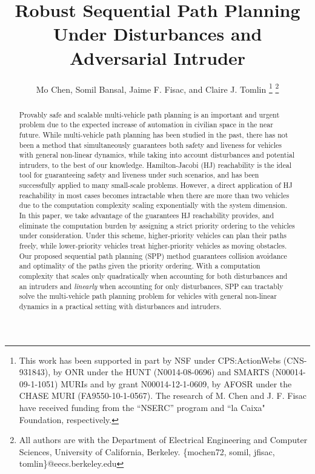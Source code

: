 \documentclass[12pt, draftcls, onecolumn]{IEEEtran}
\title{\LARGE \bf Robust Sequential Path Planning Under Disturbances and Adversarial Intruder}
\author{Mo Chen, Somil Bansal, Jaime F. Fisac, and Claire J. Tomlin
\thanks{This work has been supported in part by NSF under CPS:ActionWebs (CNS-931843), by ONR under the HUNT (N0014-08-0696) and SMARTS (N00014-09-1-1051) MURIs and by grant N00014-12-1-0609, by AFOSR under the CHASE MURI (FA9550-10-1-0567). The research of M. Chen and J. F. Fisac have received funding from the ``NSERC'' program and ``la Caixa" Foundation, respectively.}
\thanks{All authors are with the Department of Electrical Engineering and Computer Sciences, University of California, Berkeley. \{mochen72, somil, jfisac, tomlin\}@eecs.berkeley.edu}
}
\begin{document}
\maketitle
\thispagestyle{empty}
\pagestyle{empty}

\begin{abstract}
Provably safe and scalable multi-vehicle path planning is an important and urgent problem due to the expected increase of automation in civilian space in the near future. While multi-vehicle path planning has been studied in the past, there has not been a method that simultaneously guarantees both safety and liveness for vehicles with general non-linear dynamics, while taking into account disturbances and potential intruders, to the best of our knowledge. Hamilton-Jacobi (HJ) reachability is the ideal tool for guaranteeing safety and liveness under such scenarios, and has been successfully applied to many small-scale problems. However, a direct application of HJ reachability in most cases becomes intractable when there are more than two vehicles due to the computation complexity scaling exponentially with the system dimension. In this paper, we take advantage of the guarantees HJ reachability provides, and eliminate the computation burden by assigning a strict priority ordering to the vehicles under consideration. Under this scheme, higher-priority vehicles can plan their paths freely, while lower-priority vehicles treat higher-priority vehicles as moving obstacles. Our proposed sequential path planning (SPP) method guarantees collision avoidance and optimality of the paths given the priority ordering. With a computation complexity that scales only quadratically when accounting for both disturbances and an intruders and \textit{linearly} when accounting for only disturbances, SPP can tractably solve the multi-vehicle path planning problem for vehicles with general non-linear dynamics in a practical setting with disturbances and intruders. 
\end{abstract}















\end{document}
